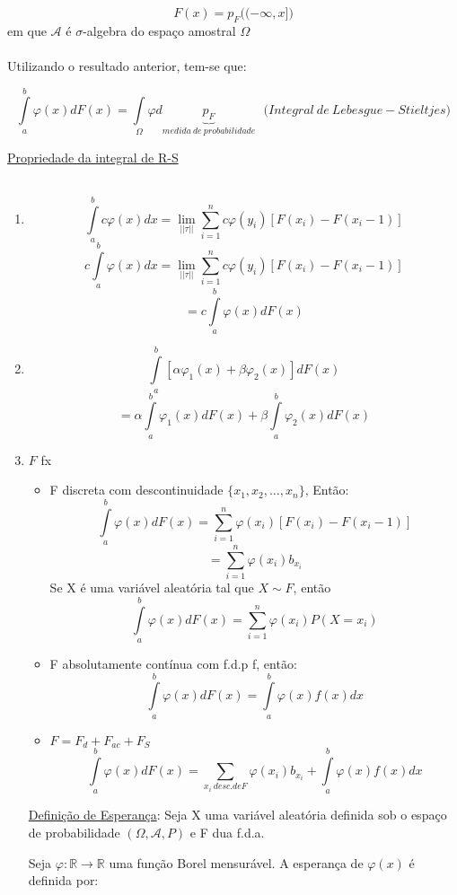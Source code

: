 \documentclass[a4paper,12pt]{article}
\begin{document}
$$F(x) = p_F\bigg((-\infty,x]\bigg) $$
em que $\mathscr A$  é $\sigma$-algebra do espaço amostral $\Omega$\\
\\
Utilizando o resultado anterior, tem-se que:

$$\int\limits_a^b \varphi(x)dF(x)= \int\limits_{\Omega} \varphi d\underbrace{p_F}_{medida \ de \ probabilidade} 
\ \ \ \bigg(Integral \ de \ Lebesgue-Stieltjes \bigg)
$$

\newpage 

\underline{Propriedade da integral de R-S}\\
\\

\begin{enumerate}[label=\arabic*)]
	\item  $$\int\limits_a^b c\varphi(x)dx = \lim\limits_{||\tau||}\sum\limits_{i=1}^n c\varphi(y_i)[F(x_i)-F(x_i-1)] $$
	$$ c\int\limits_a^b \varphi(x)dx = \lim\limits_{||\tau||}\sum\limits_{i=1}^n c\varphi(y_i)[F(x_i)-F(x_i-1)] $$
		$$=c\int\limits_a^b \varphi(x)dF(x)$$
		\item 
		$$ 
		\int\limits_a^b[\alpha \varphi_1(x)+ \beta \varphi_2(x)]dF(x)
		$$
				$$ 
		=\alpha \int\limits_a^b\varphi_1(x)dF(x)+ \beta  \int\limits_a^b\varphi_2(x)dF(x)
		$$
		
		\item $F$ fx
		\begin{itemize}
			\item F discreta com descontinuidade $\{x_1,x_2,\ldots,x_n\}$, Então:
			$$\int\limits_a^b \varphi(x)dF(x) = \sum\limits_{i=1}^{n} \varphi(x_i)[F(x_i)-F(x_i-1)] $$
			$$= \sum\limits_{i=1}^{n}\varphi(x_i)b_{x_i} $$
			Se X é uma variável aleatória tal que $X\sim F$, então
			$$\int\limits_a^b \varphi(x)dF(x) = \sum\limits_{i=1}^{n}\varphi(x_i)P(X=x_i)$$
			\item F absolutamente contínua com f.d.p f, então:
			$$\int\limits_a^b \varphi(x)dF(x)= \int\limits_a^b \varphi(x) f(x)dx $$
			
			\item $F=F_d +F_{ac} + F_S$
			$$ \int\limits_a^b \varphi(x)dF(x)= \sum\limits_{x_i \ desc. de F}\varphi(x_i)b_{x_i} + 
			\int\limits_a^b \varphi(x) f(x)dx 
			$$
		\end{itemize} 
	\newpage 
	\underline{Definição de Esperança}:
	Seja X uma variável aleatória definida sob o espaço de probabilidade $(\Omega,\mathscr{A},P)$ e F dua f.d.a.
	
	Seja $\varphi:\mathbb R\longrightarrow \mathbb R$ uma função Borel mensurável. A esperança de $\varphi(x)$ é definida por:
	

\end{enumerate}
\end{document}
